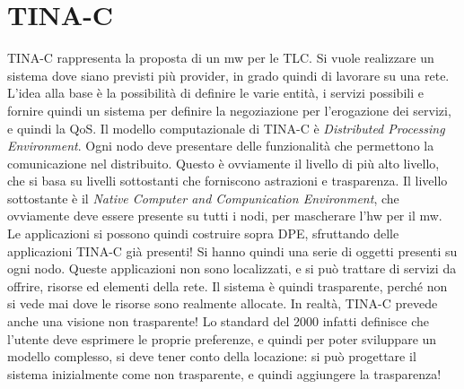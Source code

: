 \section{TINA-C}
TINA-C rappresenta la proposta di un mw per le TLC. Si vuole realizzare un sistema dove siano previsti più provider,
in grado quindi di lavorare su una rete. L'idea alla base è la possibilità di definire le varie entità, i servizi
possibili e fornire quindi un sistema per definire la negoziazione per l'erogazione dei servizi, e quindi la QoS.
Il modello computazionale di TINA-C è \textit{Distributed Processing Environment}.
Ogni nodo deve presentare delle funzionalità che permettono la comunicazione nel distribuito. Questo è ovviamente il
livello di più alto livello, che si basa su livelli sottostanti che forniscono astrazioni e trasparenza. Il livello
sottostante è il \textit{Native Computer and Compunication Environment}, che ovviamente deve essere presente su tutti
i nodi, per mascherare l'hw per il mw.
Le applicazioni si possono quindi costruire sopra DPE, sfruttando delle applicazioni TINA-C già presenti! Si hanno
quindi una serie di oggetti presenti su ogni nodo. Queste applicazioni non sono localizzati, e si può trattare di
servizi da offrire, risorse ed elementi della rete. Il sistema è quindi trasparente, perché non si vede mai dove le
risorse sono realmente allocate.
In realtà, TINA-C prevede anche una visione non trasparente! Lo standard del 2000 infatti definisce che l'utente deve
esprimere le proprie preferenze, e quindi per poter sviluppare un modello complesso, si deve tener conto della
locazione: si può progettare il sistema inizialmente come non trasparente, e quindi aggiungere la trasparenza!
